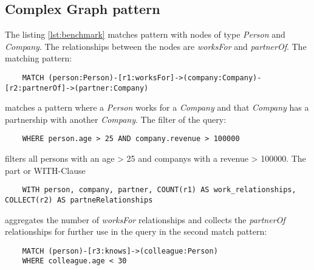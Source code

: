 \subsection{Complex Graph pattern}
The listing \ref{lst:benchmark} matches pattern
with nodes of type \textit{Person} and \textit{Company}. 
The relationships between the nodes are \textit{worksFor} and \textit{partnerOf}. 
The matching pattern:
\begin{lstlisting}
    MATCH (person:Person)-[r1:worksFor]->(company:Company)-[r2:partnerOf]->(partner:Company)
\end{lstlisting}
matches a pattern where a \textit{Person} works for a \textit{Company} and that 
\textit{Company} has a partnership with another \textit{Company}.
The filter of the query:
\begin{lstlisting}
	WHERE person.age > 25 AND company.revenue > 100000
\end{lstlisting}
filters all persons with an age > 25 and companys with a revenue > 100000.
The part or WITH-Clause
\begin{lstlisting}
	WITH person, company, partner, COUNT(r1) AS work_relationships, COLLECT(r2) AS partneRelationships
\end{lstlisting}
aggregates the number of \textit{worksFor} relationships and collects the 
\textit{partnerOf} relationships for further use in the query in the second match pattern:
\begin{lstlisting}
	MATCH (person)-[r3:knows]->(colleague:Person)
	WHERE colleague.age < 30
\end{lstlisting}
\newpage


